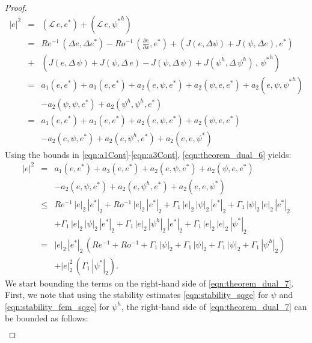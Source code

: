 \begin{proof}
\begin{eqnarray}
|e|^2
&=& (\mathcal{L} \, e , e^*)
+ (\mathcal{L} \, e , {\psi^*}^h)
\nonumber \\
&=& Re^{-1} \, (\Delta e , \Delta e^*)
- Ro^{-1} \, \left( \frac{\partial e}{\partial x} , e^* \right)
+ \left(
J(e , \Delta \psi)
+ J(\psi , \Delta e)
, e^*
\right)
\nonumber \\
&+& \left(
 J(e , \Delta \, \psi)
+ J(\psi , \Delta \, e)
- J(\psi , \Delta \, \psi)
+ J(\psi^h , \Delta \, \psi^h)
 \, , \,  
{\psi^*}^h
\right) 
\nonumber \\
&=& a_1(e , e^*)
+ a_3(e , e^*)
+ a_2(e , \psi , e^*)
+ a_2(\psi , e, e^*)
+ a_2(e , \psi , {\psi^*}^h)
\nonumber \\
&& - a_2(\psi , \psi , e^*)
+ a_2(\psi^h , \psi^h , e^*)
\nonumber \\
&=& a_1(e , e^*)
+ a_3(e , e^*)
+ a_2(e , \psi , e^*)
+ a_2(\psi , e, e^*)
\nonumber \\
&& - a_2(e , \psi , e^*)
+ a_2(e , \psi^h , e^*)
+ a_2(e , e , \psi^*)
\label{eqn:theorem_dual_6}
\end{eqnarray}
Using the bounds in \eqref{eqn:a1Cont}-\eqref{eqn:a3Cont}, \eqref{eqn:theorem_dual_6} yields:
\begin{eqnarray}
|e|^2
&=& a_1(e , e^*)
+ a_3(e , e^*)
+ a_2(e , \psi , e^*)
+ a_2(\psi , e, e^*)
\nonumber \\
&& - a_2(e , \psi , e^*)
+ a_2(e , \psi^h , e^*)
+ a_2(e , e , \psi^*)
\nonumber \\
&\leq& Re^{-1} \, | e |_2 \, |e^* |_2
+ Ro^{-1} \, | e |_2 \, |e^* |_2
+ \Gamma_1 \, | e |_2 \, | \psi |_2 \, | e^* |_2
+ \Gamma_1 \, | \psi |_2 \, | e |_2 \, | e^* |_2
\nonumber \\
&& + \Gamma_1 \, | e |_2 \, | \psi |_2 \, | e^* |_2
+ \Gamma_1 \, | e |_2 \, | \psi^h |_2 \, | e^* |_2
+ \Gamma_1 \, | e |_2 \, | e |_2 \, | \psi^* |_2
\nonumber \\
&=& | e |_2 \, |e^* |_2 \, 
\left(
Re^{-1}
+ Ro^{-1} 
+ \Gamma_1 \, | \psi |_2 
+ \Gamma_1 \, | \psi |_2
+ \Gamma_1 \, | \psi |_2
+ \Gamma_1 \, | \psi^h |_2
\right)
\nonumber \\
&& + | e |_2^2 \, 
\left(
\Gamma_1 \, | \psi^* |_2
\right) .
\label{eqn:theorem_dual_7}
\end{eqnarray}
We start bounding the terms on the right-hand side of \eqref{eqn:theorem_dual_7}.
First, we note that using the stability estimates \eqref{eqn:stability_sqge} for $\psi$ and \eqref{eqn:stability_fem_sqge} for $\psi^h$, the right-hand side of \eqref{eqn:theorem_dual_7} can be bounded as follows:
\begin{eqnarray}

\end{eqnarray}
\end{proof}
